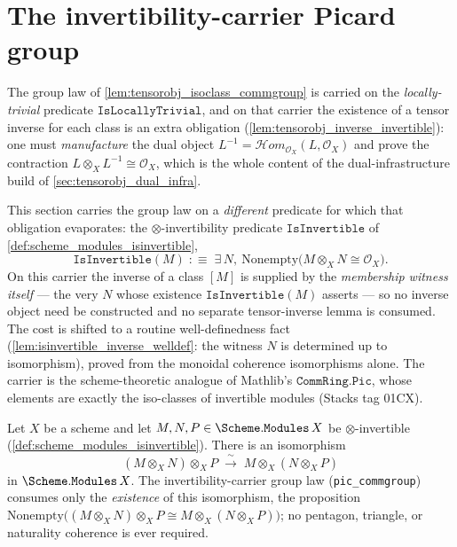 \section{The invertibility-carrier Picard group}
\label{sec:tensorobj_pic_carrier}

The group law of \cref{lem:tensorobj_isoclass_commgroup} is carried on the
\emph{locally-trivial} predicate \(\mathtt{IsLocallyTrivial}\), and on that carrier
the existence of a tensor inverse for each class is an extra obligation
(\cref{lem:tensorobj_inverse_invertible}): one must \emph{manufacture} the dual
object \(L^{-1} = \mathcal{H}om_{\mathcal{O}_X}(L, \mathcal{O}_X)\) and prove the
contraction \(L \otimes_X L^{-1} \cong \mathcal{O}_X\), which is the whole content of
the dual-infrastructure build of \cref{sec:tensorobj_dual_infra}.

This section carries the group law on a \emph{different} predicate for which that
obligation evaporates: the \(\otimes\)-invertibility predicate
\(\mathtt{IsInvertible}\) of \cref{def:scheme_modules_isinvertible},
\[
  \mathtt{IsInvertible}(M)
  \;:\equiv\;
  \exists\, N,\ \mathrm{Nonempty}\bigl(M \otimes_X N \cong \mathcal{O}_X\bigr).
\]
On this carrier the inverse of a class \([M]\) is supplied by the \emph{membership
witness itself} --- the very \(N\) whose existence \(\mathtt{IsInvertible}(M)\)
asserts --- so no inverse object need be constructed and no separate
tensor-inverse lemma is consumed. The cost is shifted to a routine
well-definedness fact (\cref{lem:isinvertible_inverse_welldef}: the witness \(N\) is
determined up to isomorphism), proved from the monoidal coherence isomorphisms
alone. The carrier is the scheme-theoretic analogue of Mathlib's
\(\mathtt{CommRing.Pic}\), whose elements are exactly the iso-classes of invertible
modules (Stacks tag 01CX).

\begin{lemma}


  \label{lem:tensorobj_assoc_iso_invertible}
  Let \(X\) be a scheme and let
  \(M, N, P \in \Scheme.\mathtt{Modules}\,X\) be \(\otimes\)-invertible
  (\cref{def:scheme_modules_isinvertible}). There is an isomorphism
  \[
    (M \otimes_X N) \otimes_X P
      \;\xrightarrow{\ \sim\ }\;
    M \otimes_X (N \otimes_X P)
  \]
  in \(\Scheme.\mathtt{Modules}\,X\). The invertibility-carrier group law
  (\texttt{pic\_commgroup}) consumes only the \emph{existence} of this
  isomorphism, the proposition \(\mathrm{Nonempty}\bigl((M \otimes_X N) \otimes_X P
  \cong M \otimes_X (N \otimes_X P)\bigr)\); no pentagon, triangle, or naturality
  coherence is ever required.
\end{lemma}

